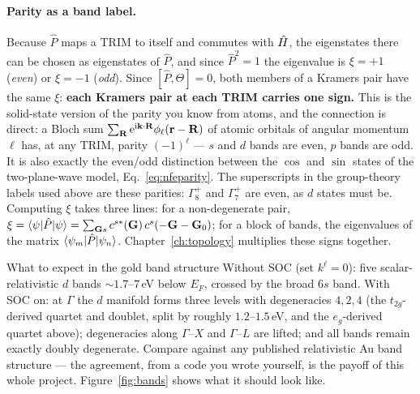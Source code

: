 \paragraph{Parity as a band label.} Because $\hat P$ maps a TRIM to itself
and commutes with $\hat{H}$, the eigenstates there can be chosen as
eigenstates of $\hat P$, and since $\hat P^2 = 1$ the eigenvalue is
$\xi = +1$ (\emph{even}) or $\xi=-1$ (\emph{odd}). Since
$[\hat P,\Theta]=0$, both members of a Kramers pair have the same $\xi$:
\textbf{each Kramers pair at each TRIM carries one sign.} This is the
solid-state version of the parity you know from atoms, and the connection
is direct: a Bloch sum $\sum_{\mathbf{R}}\mathrm{e}^{\mathrm{i}\mathbf{k}\cdot\mathbf{R}}\phi_\ell(\mathbf{r}-\mathbf{R})$
of atomic orbitals of angular momentum $\ell$ has, at any TRIM, parity
$(-1)^\ell$ --- $s$ and $d$ bands are even, $p$ bands are odd. It is also
exactly the even/odd distinction between the $\cos$ and $\sin$ states of
the two-plane-wave model, Eq.~\eqref{eq:nfeparity}. The superscripts in
the group-theory labels used above are these parities: $\Gamma_8^{+}$ and
$\Gamma_7^{+}$ are even, as $d$ states must be. Computing $\xi$ takes
three lines: for a non-degenerate pair,
$\xi = \braket{\psi|\hat P|\psi} = \sum_{\mathbf{G} s} c^{s*}(\mathbf{G})\,
c^{s}(-\mathbf{G}-\mathbf{G}_0)$; for a block of bands, the eigenvalues of the matrix
$\braket{\psi_m|\hat P|\psi_n}$. Chapter~\ref{ch:topology} multiplies
these signs together.

\begin{keybox}{What to expect in the gold band structure}
Without SOC (set $k^\ell = 0$): five scalar-relativistic $d$ bands
$\sim 1.7$--$7$\,eV below $E_F$, crossed by the broad $6s$ band. With SOC on:
at $\Gamma$ the $d$ manifold forms three levels with degeneracies $4, 2, 4$
(the $t_{2g}$-derived quartet and doublet, split by roughly
$1.2$--$1.5$\,eV, and the $e_g$-derived quartet above); degeneracies along $\Gamma$--$X$ and
$\Gamma$--$L$ are lifted; and all bands remain exactly doubly degenerate.
Compare against any published relativistic Au band structure --- the
agreement, from a code you wrote yourself, is the payoff of this whole
project. Figure~\ref{fig:bands} shows what it should look like.
\end{keybox}

